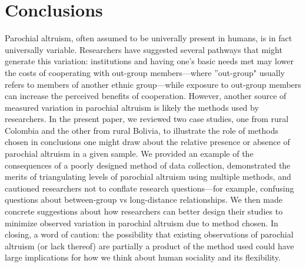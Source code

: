 \documentclass[bibauthoryear]{aa}
\begin{document}

\section{Conclusions}

Parochial altruism, often assumed to be univerally present in humans, is in fact universally variable. Researchers have suggested several pathways that might generate this variation: institutions and having one's basic needs met may lower the costs of cooperating with out-group members---where ''out-group" usually refers to members of another ethnic group---while exposure to out-group members can increase the perceived benefits of cooperation. However, another source of measured variation in parochial altruism is likely the methods used by researchers. In the present paper, we reviewed two case studies, one from rural Colombia and the other from rural Bolivia, to illustrate the role of methods chosen in conclusions one might draw about the relative presence or absence of parochial altruism in a given sample. We provided an example of the consequences of a poorly designed method of data collection, demonstrated the merits of triangulating levels of parochial altruism using multiple methods, and cautioned researchers not to conflate research questions---for example, confusing questions about between-group vs long-distance relationships. We then made concrete suggestions about how researchers can better design their studies to minimize observed variation in parochial altruism due to method chosen. In closing, a word of caution: the possibility that existing observations of parochial altruism (or lack thereof) are partially a product of the method used could have large implications for how we think about human sociality and its flexibility.
\end{document}
